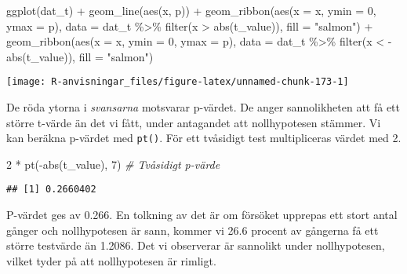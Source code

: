 \documentclass[
]{book}
\newenvironment{Shaded}{\begin{snugshade}}{\end{snugshade}}
\newcommand{\AttributeTok}[1]{\textcolor[rgb]{0.77,0.63,0.00}{#1}}
\newcommand{\CommentTok}[1]{\textcolor[rgb]{0.56,0.35,0.01}{\textit{#1}}}
\newcommand{\DecValTok}[1]{\textcolor[rgb]{0.00,0.00,0.81}{#1}}
\newcommand{\FunctionTok}[1]{\textcolor[rgb]{0.00,0.00,0.00}{#1}}
\newcommand{\NormalTok}[1]{#1}
\newcommand{\SpecialCharTok}[1]{\textcolor[rgb]{0.00,0.00,0.00}{#1}}
\newcommand{\StringTok}[1]{\textcolor[rgb]{0.31,0.60,0.02}{#1}}
\theoremstyle{definition}
\theoremstyle{definition}
\theoremstyle{definition}
\theoremstyle{definition}
\theoremstyle{remark}
\begin{document}
\begin{Shaded}
\begin{Highlighting}[]
\FunctionTok{ggplot}\NormalTok{(dat\_t) }\SpecialCharTok{+}
  \FunctionTok{geom\_line}\NormalTok{(}\FunctionTok{aes}\NormalTok{(x, p)) }\SpecialCharTok{+}
  \FunctionTok{geom\_ribbon}\NormalTok{(}\FunctionTok{aes}\NormalTok{(}\AttributeTok{x =}\NormalTok{ x, }\AttributeTok{ymin =} \DecValTok{0}\NormalTok{, }\AttributeTok{ymax =}\NormalTok{ p), }\AttributeTok{data =}\NormalTok{ dat\_t }\SpecialCharTok{\%\textgreater{}\%} \FunctionTok{filter}\NormalTok{(x }\SpecialCharTok{\textgreater{}} \FunctionTok{abs}\NormalTok{(t\_value)), }\AttributeTok{fill =} \StringTok{"salmon"}\NormalTok{) }\SpecialCharTok{+}
  \FunctionTok{geom\_ribbon}\NormalTok{(}\FunctionTok{aes}\NormalTok{(}\AttributeTok{x =}\NormalTok{ x, }\AttributeTok{ymin =} \DecValTok{0}\NormalTok{, }\AttributeTok{ymax =}\NormalTok{ p), }\AttributeTok{data =}\NormalTok{ dat\_t }\SpecialCharTok{\%\textgreater{}\%} \FunctionTok{filter}\NormalTok{(x }\SpecialCharTok{\textless{}} \SpecialCharTok{{-}}\FunctionTok{abs}\NormalTok{(t\_value)), }\AttributeTok{fill =} \StringTok{"salmon"}\NormalTok{)}
\end{Highlighting}
\end{Shaded}

\begin{center}\texttt{[image: R-anvisningar\_files/figure-latex/unnamed-chunk-173-1]} \end{center}

De röda ytorna i \emph{svansarna} motsvarar p-värdet. De anger sannolikheten att få ett större t-värde än det vi fått, under antagandet att nollhypotesen stämmer. Vi kan beräkna p-värdet med \texttt{pt()}. För ett tvåsidigt test multipliceras värdet med 2.

\begin{Shaded}
\begin{Highlighting}[]
\DecValTok{2} \SpecialCharTok{*} \FunctionTok{pt}\NormalTok{(}\SpecialCharTok{{-}}\FunctionTok{abs}\NormalTok{(t\_value), }\DecValTok{7}\NormalTok{) }\CommentTok{\# Tvåsidigt p{-}värde}
\end{Highlighting}
\end{Shaded}

\begin{verbatim}
## [1] 0.2660402
\end{verbatim}

P-värdet ges av 0.266. En tolkning av det är om försöket upprepas ett stort antal gånger och nollhypotesen är sann, kommer vi 26.6 procent av gångerna få ett större testvärde än 1.2086. Det vi observerar är sannolikt under nollhypotesen, vilket tyder på att nollhypotesen är rimligt.
\end{document}
